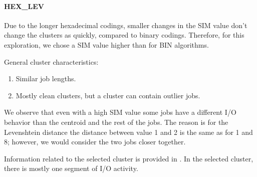 \documentclass{jhps}
\begin{document}
\FloatBarrier
\paragraph{HEX\_LEV}
Due to the longer hexadecimal codings, smaller changes in the SIM value don't change the clusters as quickly,  compared to binary codings.
Therefore, for this exploration, we chose a SIM value higher than for BIN algorithms.

General cluster characteristics:
\begin{enumerate}
 \item Similar job lengths.
 \item Mostly clean clusters, but a cluster can contain outlier jobs.
\end{enumerate}

We observe that even with a high SIM value some jobs have a different I/O behavior than the centroid and the rest of the jobs.
The reason is for the Levenshtein distance the distance between value 1 and 2 is the same as for 1 and 8; however, we would consider the two jobs closer together.

Information related to the selected cluster is provided in .
In the selected cluster, there is mostly one segment of I/O activity.
\end{document}
